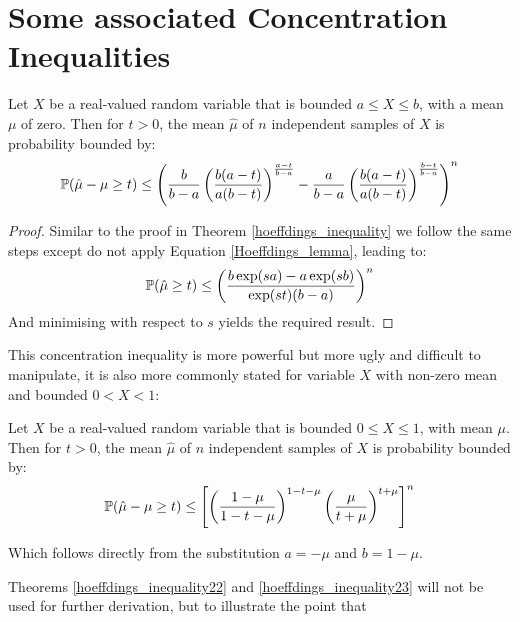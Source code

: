 


\section{Some associated Concentration Inequalities}\label{Appendix:more_concentration}

\begin{theorem}\label{hoeffdings_inequality22}
Let $X$ be a real-valued random variable that is bounded $a\le X\le b$, with a mean $\mu$ of zero.  Then for $t>0$, the mean $\hat{\mu}$ of $n$ independent samples of $X$ is probability bounded by:
\begin{equation}\operatorname{\mathbb{P}}(\hat{\mu}-\mu\ge t)\le \left( \frac{b}{b-a}\left(\frac{b(a-t)}{a(b-t)}\right)^{\frac{a-t}{b-a}} -\frac{a}{b-a}\left(\frac{b(a-t)}{a(b-t)}\right)^{\frac{b-t}{b-a}}  \right)^n
\end{equation}
\end{theorem}
\begin{proof}
Similar to the proof in Theorem \ref{hoeffdings_inequality} we follow the same steps except do not apply Equation \ref{Hoeffdings_lemma}, leading to:
$$ \operatorname{\mathbb{P}}(\hat{\mu}\ge t) \le \left(\frac{b\exp(sa) - a\exp(sb)}{\exp(st)(b-a)}\right)^n $$
And minimising with respect to $s$ 
yields the required result.
\end{proof}
This concentration inequality is more powerful but more ugly and difficult to manipulate, it is also more commonly stated for variable $X$ with non-zero mean and bounded $0<X<1$:

\begin{theorem}\label{hoeffdings_inequality23}
Let $X$ be a real-valued random variable that is bounded $0\le X\le 1$, with mean $\mu$. Then for $t>0$, the mean $\hat{\mu}$ of $n$ independent samples of $X$ is probability bounded by:
\begin{equation}\operatorname{\mathbb{P}}(\hat{\mu}-\mu\ge t)\le \left[\left(\frac{1-\mu}{1-t-\mu}\right)^{1-t-\mu}  \left(\frac{\mu}{t+\mu}\right)^{t+\mu}\right]^n
\end{equation}
\end{theorem}
Which follows directly from the substitution $a=-\mu$ and $b=1-\mu$.

Theorems \ref{hoeffdings_inequality22} and \ref{hoeffdings_inequality23} will not be used for further derivation, but to illustrate the point that 



